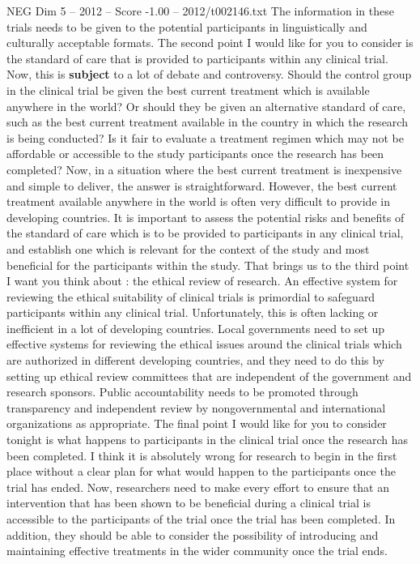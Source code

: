 \begin{textsample}{NEG Dim 5 – 2012 – Score -1.00 – 2012/t002146.txt}
The information in these trials needs to be given to the potential participants in linguistically and culturally acceptable formats.
The second point I would like for you to consider is the standard of care that is provided to participants within any clinical trial.
Now, this is \textbf{subject} to a lot of debate and controversy.
Should the control group in the clinical trial be given the best current treatment which is available anywhere in the world?
Or should they be given an alternative standard of care, such as the best current treatment available in the country in which the research is being conducted?
Is it fair to evaluate a treatment regimen which may not be affordable or accessible to the study participants once the research has been completed?
Now, in a situation where the best current treatment is inexpensive and simple to deliver, the answer is straightforward.
However, the best current treatment available anywhere in the world is often very difficult to provide in developing countries.
It is important to assess the potential risks and benefits of the standard of care which is to be provided to participants in any clinical trial, and establish one which is relevant for the context of the study and most beneficial for the participants within the study.
That brings us to the third point I want you think about : the ethical review of research.
An effective system for reviewing the ethical suitability of clinical trials is primordial to safeguard participants within any clinical trial.
Unfortunately, this is often lacking or inefficient in a lot of developing countries.
Local governments need to set up effective systems for reviewing the ethical issues around the clinical trials which are authorized in different developing countries, and they need to do this by setting up ethical review committees that are independent of the government and research sponsors.
Public accountability needs to be promoted through transparency and independent review by nongovernmental and international organizations as appropriate.
The final point I would like for you to consider tonight is what happens to participants in the clinical trial once the research has been completed.
I think it is absolutely wrong for research to begin in the first place without a clear plan for what would happen to the participants once the trial has ended.
Now, researchers need to make every effort to ensure that an intervention that has been shown to be beneficial during a clinical trial is accessible to the participants of the trial once the trial has been completed.
In addition, they should be able to consider the possibility of introducing and maintaining effective treatments in the wider community once the trial ends.

\end{textsample}
